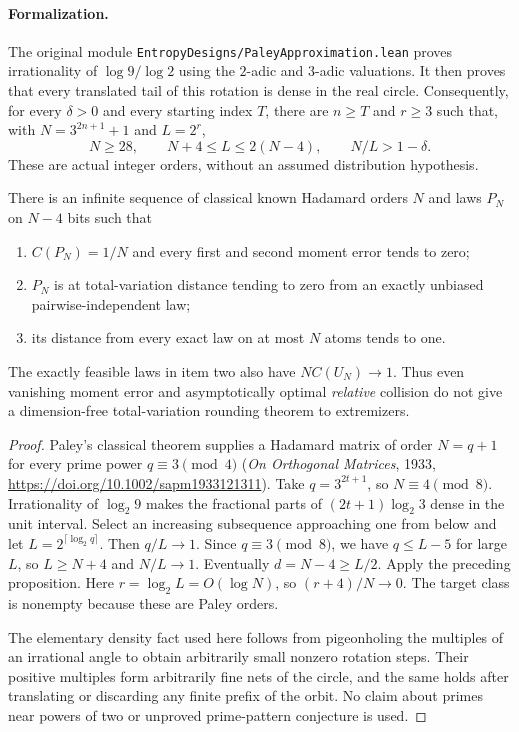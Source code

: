 \paragraph{Formalization.}
The original module
\texttt{EntropyDesigns/\allowbreak PaleyApproximation.lean}
proves irrationality of $\log 9/\log 2$ using the $2$-adic and
$3$-adic valuations. It then proves that every translated tail of
this rotation is dense in the real circle. Consequently, for every
$\delta>0$ and every starting index $T$, there are $n\ge T$ and
$r\ge3$ such that, with $N=3^{2n+1}+1$ and $L=2^r$,
\[
 N\ge28,\qquad N+4\le L\le2(N-4),\qquad N/L>1-\delta.
\]
These are actual integer orders, without an assumed distribution
hypothesis.

\begin{theorem}
\label{s20:thm:rank-asymptotic}
There is an infinite sequence of classical known Hadamard orders $N$
and laws $P_N$ on $N-4$ bits such that
\begin{enumerate}
\item $C(P_N)=1/N$ and every first and second moment error tends to zero;
\item $P_N$ is at total-variation distance tending to zero from an
exactly unbiased pairwise-independent law;
\item its distance from every exact law on at most $N$ atoms tends to one.
\end{enumerate}
The exactly feasible laws in item two also have
$N C(U_N)\longrightarrow1$. Thus even vanishing moment error and
asymptotically optimal \emph{relative} collision do not give a
dimension-free total-variation rounding theorem to extremizers.
\end{theorem}
\begin{proof}
Paley's classical theorem supplies a Hadamard matrix of order
$N=q+1$ for every prime power $q\equiv3\pmod4$
(\emph{On Orthogonal Matrices}, 1933,
\url{https://doi.org/10.1002/sapm1933121311}).
Take $q=3^{2t+1}$, so $N\equiv4\pmod8$.
Irrationality of $\log_2 9$ makes the fractional parts of
$(2t+1)\log_2 3$ dense in the unit interval. Select an increasing
subsequence approaching one from below and let
$L=2^{\lceil\log_2 q\rceil}$. Then $q/L\to1$. Since $q\equiv3\pmod8$,
we have $q\le L-5$ for large $L$, so $L\ge N+4$ and $N/L\to1$.
Eventually $d=N-4\ge L/2$. Apply the preceding proposition.
Here $r=\log_2 L=O(\log N)$, so $(r+4)/N\to0$.
The target class is nonempty because these are Paley orders.

The elementary density fact used here follows from pigeonholing the
multiples of an irrational angle to obtain arbitrarily small nonzero
rotation steps. Their positive multiples form arbitrarily fine nets
of the circle, and the same holds after translating or discarding any
finite prefix of the orbit. No claim about primes near powers of two
or unproved prime-pattern conjecture is used.
\end{proof}


